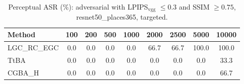 \begin{table}[t]
\centering\footnotesize
\caption{Perceptual ASR (\%): adversarial with LPIPS$_{\mathrm{vgg}}$ $\le 0.3$ and SSIM $\ge 0.75$, resnet50\_places365, targeted.}
\begin{tabular}{lcccccccc}
\toprule
Method & 100 & 200 & 500 & 1000 & 2000 & 2500 & 5000 & 10000 \\
\midrule
LGC\_RC\_EGC & 0.0 & 0.0 & 0.0 & 0.0 & 66.7 & 66.7 & 100.0 & 100.0 \\
TtBA & 0.0 & 0.0 & 0.0 & 0.0 & 0.0 & 0.0 & 0.0 & 33.3 \\
CGBA\_H & 0.0 & 0.0 & 0.0 & 0.0 & 0.0 & 0.0 & 0.0 & 66.7 \\
\bottomrule
\end{tabular}
\end{table}
